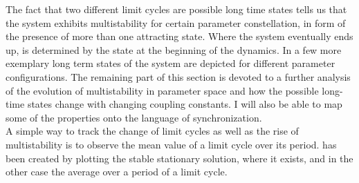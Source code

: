 The fact that two different limit cycles are possible long time states tells us that the system exhibits multistability for certain parameter constellation, in form of the presence of more than one attracting state. Where the system eventually ends up, is determined by the state at the beginning of the dynamics. In  a few more exemplary long term states of the system are depicted for different parameter configurations.\newpage
The remaining part of this section is devoted to a further analysis of the evolution of multistability in parameter space and how the possible long-time states change with changing coupling constants. I will also be able to map some of the properties onto the language of synchronization.\\
A simple way to track the change of limit cycles as well as the rise of multistability is to observe the mean value of a limit cycle over its period.
 has been created by plotting the stable stationary solution, where it exists, and in the other case the average over a period of a limit cycle.




